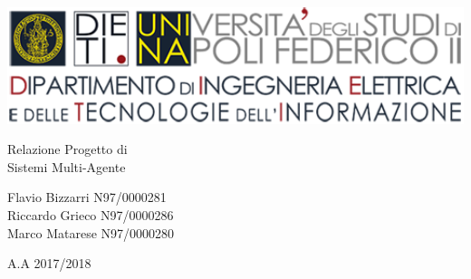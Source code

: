 
\thispagestyle{empty}

\begin{center}
	\includegraphics[width=1\textwidth]{DIETI}
	
	\par\bigskip\par\bigskip\par\bigskip\par\bigskip\par\bigskip\par\bigskip\par\bigskip\par	%
	
	{\huge Relazione Progetto di\\}
	{\huge Sistemi Multi-Agente\\}
	
	\par\bigskip\par\bigskip\par\bigskip\par\bigskip\par\bigskip\par\bigskip\par\bigskip\par	%
	
	{\LARGE Flavio Bizzarri N97/0000281\\}
	{\LARGE Riccardo Grieco N97/0000286\\}
	{\LARGE Marco Matarese N97/0000280\\}
	
	\par\bigskip\par\bigskip\par\bigskip\par\bigskip\par\bigskip\par\bigskip	%
	
	{\large A.A 2017/2018\par}
	
\end{center}

